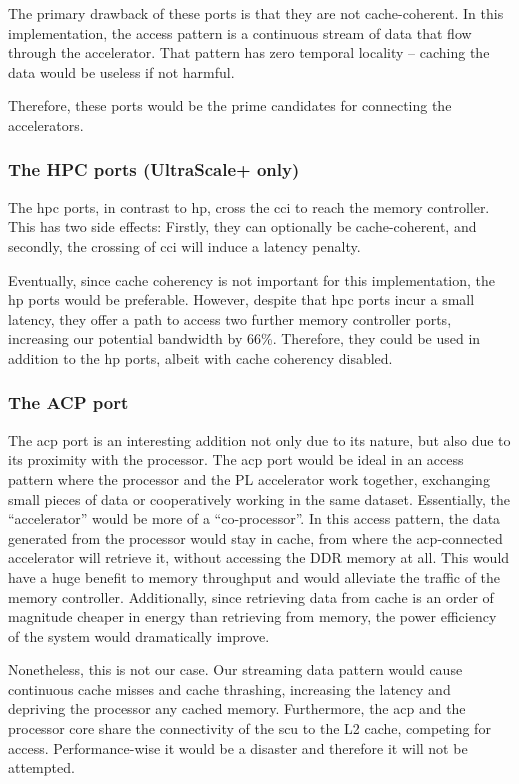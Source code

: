 The primary drawback of these ports is that they are not cache-coherent.
In this implementation, the access pattern is a continuous stream of data
that flow through the accelerator. That pattern has zero temporal locality --
caching the data would be useless if not harmful.

Therefore, these ports would be the prime candidates for connecting 
the accelerators.

\subsubsection{The HPC ports (UltraScale+ only)}

The \gls{hpc} ports, in contrast to \gls{hp}, cross the \gls{cci} to reach
the memory controller. This has two side effects: Firstly, they can 
optionally be cache-coherent, and secondly, the crossing of \gls{cci}
will induce a latency penalty.

Eventually, since cache coherency is not important for this implementation,
the \gls{hp} ports would be preferable. However, despite that \gls{hpc} ports
incur a small latency, they offer a path to access two further memory controller
ports, increasing our potential bandwidth by 66\%. 
Therefore, they could be used in addition to the \gls{hp} ports, albeit with
cache coherency disabled.

\subsubsection{The ACP port}

The \gls{acp} port is an interesting addition not only due to its 
nature, but also due to its proximity with the processor. 
The \gls{acp} port would be ideal in an access pattern where the processor and the PL accelerator
work together, exchanging small pieces of data or cooperatively working in the same dataset.
Essentially, the ``accelerator'' would be more of a ``co-processor''.
In this access pattern, the data generated from the processor would stay in cache, from where
the \gls{acp}-connected accelerator will retrieve it, without accessing the DDR memory at all.
This would have a huge benefit to memory throughput and
would alleviate the traffic of the memory controller. Additionally, since retrieving data
from cache is an order of magnitude cheaper in energy than retrieving from memory,
the power efficiency of the system would dramatically improve.

Nonetheless, this is not our case. Our streaming data pattern would 
cause continuous cache misses and cache thrashing,
increasing the latency and depriving the processor any cached memory.
Furthermore, the \gls{acp} and the processor core share the connectivity
of the \gls{scu} to the L2 cache, competing for access.
Performance-wise it would be a disaster and therefore it will not be attempted.

